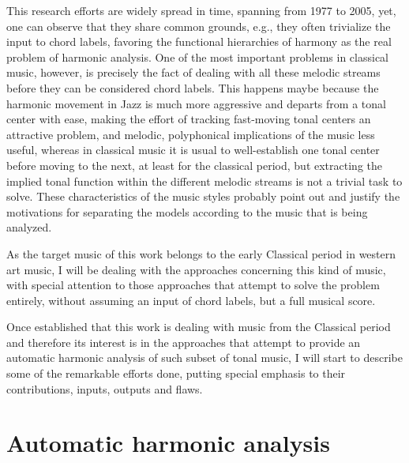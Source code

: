  This research efforts are widely spread in time, spanning from 1977 to 2005, yet, one can observe that they share common grounds, e.g., they often trivialize the input to chord labels, favoring the functional hierarchies of harmony as the real problem of harmonic analysis. One of the most important problems in classical music, however, is precisely the fact of dealing with all these melodic streams before they can be considered chord labels. This happens maybe because the harmonic movement in Jazz is much more aggressive and departs from a tonal center with ease, making the effort of tracking fast-moving tonal centers an attractive problem, and melodic, polyphonical implications of the music less useful, whereas in classical music it is usual to well-establish one tonal center before moving to the next, at least for the classical period, but extracting the implied tonal function within the different melodic streams is not a trivial task to solve. These characteristics of the music styles probably point out and justify the motivations for separating the models according to the music that is being analyzed.

 As the target music of this work belongs to the early Classical period in western art music, I will be dealing with the approaches concerning this kind of music, with special attention to those approaches that attempt to solve the problem entirely, without assuming an input of chord labels, but a full musical score.

 Once established that this work is dealing with music from the Classical period and therefore its interest is in the approaches that attempt to provide an automatic harmonic analysis of such subset of tonal music, I will start to describe some of the remarkable efforts done, putting special emphasis to their contributions, inputs, outputs and flaws.

\section{Automatic harmonic analysis}

